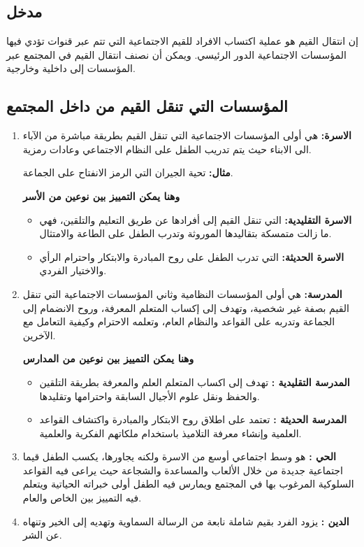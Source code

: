 \subsection{مدخل}
إن انتقال القيم هو عملية اكتساب الافراد للقيم الاجتماعية التي تتم  عبر قنوات تؤدي
فيها المؤسسات الاجتماعية الدور الرئيسي. ويمكن أن نصنف انتقال القيم في المجتمع عبر
المؤسسات إلى داخلية وخارجية.

\subsection{المؤسسات التي تنقل القيم من داخل المجتمع}
\begin{enumerate}
    \item\textbf{الاسرة:}
        هي أولى المؤسسات الاجتماعية التي تنقل القيم بطريقة مباشرة من الآباء الى
        الابناء حيث يتم تدريب الطفل على النظام الاجتماعي وعادات رمزية.
        \smallskip
        
        \textbf{مثال:}
        تحية الجيران التي الرمز الانفتاح على الجماعة.
        \smallskip
        
        \textbf{وهنا يمكن التمييز بين نوعين من الأسر}
        \begin{itemize}
            \item\textbf{الاسرة التقليدية:}
                التي تنقل القيم إلى أفرادها عن طريق التعليم والتلقين، فهي ما زالت
                متمسكة بتقاليدها الموروثة وتدرب الطفل على الطاعة والامتثال.
            \item\textbf{الاسرة الحديثة:}
                التي تدرب الطفل على روح المبادرة والابتكار واحترام الرأي والاختيار
                الفردي.
        \end{itemize}
    \item\textbf{المدرسة:}
        هي أولى المؤسسات النظامية وثاني المؤسسات الاجتماعية التي تنقل القيم بصفة
        غير شخصية، وتهدف إلى إكساب المتعلم المعرفة، وروح الانضمام إلى الجماعة 
        وتدربه على القواعد والنظام العام، وتعلمه الاحترام وكيفية التعامل مع
        الآخرين.
        \smallskip
        
        \textbf{وهنا يمكن التمييز بين نوعين من المدارس}
        \begin{itemize}
            \item\textbf{المدرسة التقليدية :}
                تهدف إلى اكساب المتعلم العلم والمعرفة بطريقة التلقين والحفظ ونقل
                علوم الأجيال السابقة واحترامها وتقليدها.
            \item\textbf{المدرسة الحديثة :}
                تعتمد على اطلاق روح الابتكار والمبادرة واكتشاف القواعد العلمية
                وإنشاء معرفة التلاميذ باستخدام ملكاتهم الفكرية والعلمية.
        \end{itemize}
    \item\textbf{الحي :}
        هو وسط اجتماعي أوسع من الاسرة ولكنه يجاورها، يكسب الطفل قيما اجتماعية
        جديدة من خلال الألعاب والمساعدة والشجاعة حيث يراعى فيه القواعد السلوكية
        المرغوب بها في المجتمع ويمارس فيه الطفل أولى خبراته الحياتية ويتعلم
        فيه التمييز بين الخاص والعام.
    \item\textbf{الدين :}
        يزود الفرد بقيم شاملة نابعة من الرسالة السماوية وتهديه إلى الخير وتنهاه
        عن الشر.
\end{enumerate}

